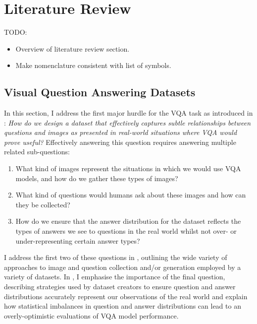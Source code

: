 \chapter{Literature Review}
\label{chapter:literature}

{\color{red} TODO:
\begin{itemize}
    \item Overview of literature review section.
    \item Make nomenclature consistent with list of symbols.
\end{itemize}}



\section{Visual Question Answering Datasets}
\label{section:vqa_datasets}

In this section, I address the first major hurdle for the VQA task as introduced in \chapterautorefname{  \ref{chapter:introduction}}: \textit{How do we design a dataset that effectively captures subtle relationships between questions and images as presented in real-world situations where VQA would prove useful?} Effectively answering this question requires answering multiple related sub-questions:

\begin{enumerate}
    \item What kind of images represent the situations in which we would use VQA models, and how do we gather these types of images?
    \item What kind of questions would humans ask about these images and how can they be collected?
    \item How do we ensure that the answer distribution for the dataset reflects the types of answers we see to questions in the real world whilst not over- or under-representing certain answer types?
\end{enumerate}

I address the first two of these questions in \subsectionautorefname{ \ref{subsection:question_and_image_collection}}, outlining the wide variety of approaches to image and question collection and/or generation employed by a variety of datasets. In \subsectionautorefname{ \ref{subsec:lanauge_priors_in_vqa_datasets}}, I emphasise the importance of the final question, describing strategies used by dataset creators to ensure question and answer distributions accurately represent our observations of the real world and explain how statistical imbalances in question and answer distributions can lead to an overly-optimistic evaluations of VQA model performance.

